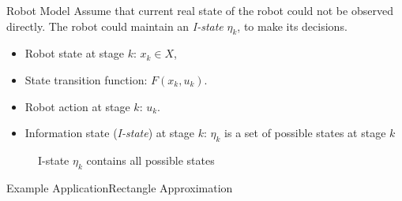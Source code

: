 \documentclass[10pt]{beamer}
\begin{document}
\begin{frame}{Robot Model}
Assume that current real state of the robot could not be observed directly.  The
robot could maintain an \emph{I-state} $\eta_k$, to make its decisions.
\begin{itemize}
\item Robot state at stage $k$: $x_k \in X$,
\item State transition function: $F(x_k, u_k)$.
\item Robot action at stage $k$: $u_k$.
\item Information state (\emph{I-state}) at stage $k$: $\eta_k$ is a set of
  possible states at stage $k$
\end{itemize}
\begin{figure}
  \caption{I-state $\eta_k$ contains all possible states}
  \label{fig:istate}
\end{figure}
\end{frame}

\begin{frame}{Example Application}{Rectangle Approximation}
  \begin{center}
  \end{center}
\end{frame}
\end{document}
